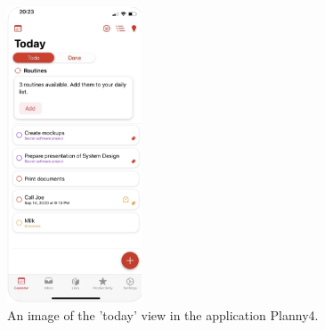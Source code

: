 \begin{figure}[htb]

	\centering
	\includegraphics[width=4cm]{./graphics/planny4.png}
	\caption{An image of the 'today' view in the application Planny4\cite{reutter_2020}.}
	\label{fig:planny4}
	
\end{figure}
